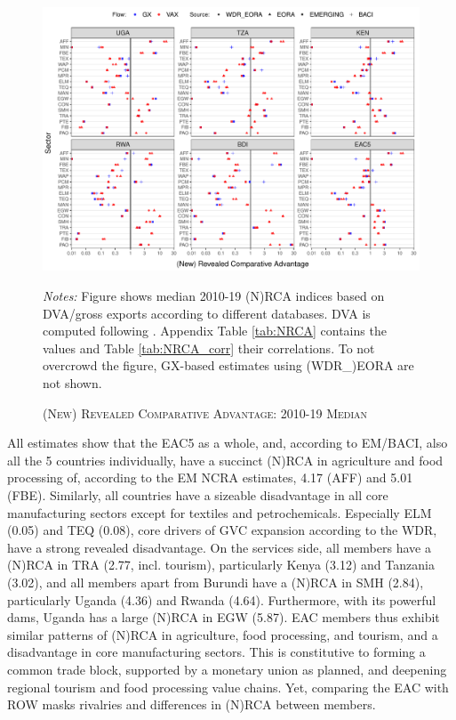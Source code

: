 \documentclass[a4paper]{article}
\begin{document}
\begin{figure}[h!] 
\centering
\caption{\label{fig:NRCA}\textsc{(New) Revealed Comparative Advantage: 2010-19 Median}}
\includegraphics[width=1\textwidth]{"Figures/NRCA_EAC5_ALL.pdf"} \\
\raggedright
\scriptsize
\emph{Notes:} Figure shows median 2010-19 (N)RCA indices based on DVA/gross exports according to different databases. DVA is computed following \citet{borin2019measuring}. Appendix Table \ref{tab:NRCA} contains the values and Table \ref{tab:NRCA_corr} their correlations. To not overcrowd the figure, GX-based estimates using (WDR\_)EORA are not shown. 
\end{figure}
\FloatBarrier

All estimates show that the EAC5 as a whole, and, according to EM/BACI, also all the 5 countries individually, have a succinct (N)RCA in agriculture and food processing of, according to the EM NCRA estimates, 4.17 (AFF) and 5.01 (FBE). Similarly, all countries have a sizeable disadvantage in all core manufacturing sectors except for textiles and petrochemicals. Especially ELM (0.05) and TEQ (0.08), core drivers of GVC expansion according to the WDR, have a strong revealed disadvantage. On the services side, all members have a (N)RCA in TRA (2.77, incl. tourism), particularly Kenya (3.12) and Tanzania (3.02), and all members apart from Burundi have a (N)RCA in SMH (2.84), particularly Uganda (4.36) and Rwanda (4.64). Furthermore, with its powerful dams, Uganda has a large (N)RCA in EGW (5.87). EAC members thus exhibit similar patterns of (N)RCA in agriculture, food processing, and tourism, and a disadvantage in core manufacturing sectors. This is constitutive to forming a common trade block, supported by a monetary union as planned, and deepening regional tourism and food processing value chains. Yet, comparing the EAC with ROW masks rivalries and differences in (N)RCA between members. 
\end{document}
